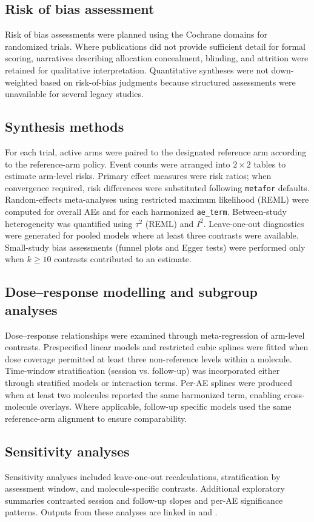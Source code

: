 \subsection{Risk of bias assessment}
Risk of bias assessments were planned using the Cochrane domains for randomized trials. Where publications did not provide sufficient detail for formal scoring, narratives describing allocation concealment, blinding, and attrition were retained for qualitative interpretation. Quantitative syntheses were not down-weighted based on risk-of-bias judgments because structured assessments were unavailable for several legacy studies.

\subsection{Synthesis methods}
For each trial, active arms were paired to the designated reference arm according to the reference-arm policy. Event counts were arranged into $2\times2$ tables to estimate arm-level risks. Primary effect measures were risk ratios; when convergence required, risk differences were substituted following \texttt{metafor} defaults. Random-effects meta-analyses using restricted maximum likelihood (REML) were computed for overall AEs and for each harmonized \texttt{ae\_term}. Between-study heterogeneity was quantified using $\tau^2$ (REML) and $I^2$. Leave-one-out diagnostics were generated for pooled models where at least three contrasts were available. Small-study bias assessments (funnel plots and Egger tests) were performed only when $k\geq10$ contrasts contributed to an estimate.

\subsection{Dose--response modelling and subgroup analyses}
Dose--response relationships were examined through meta-regression of arm-level contrasts. Prespecified linear models and restricted cubic splines were fitted when dose coverage permitted at least three non-reference levels within a molecule. Time-window stratification (session vs. follow-up) was incorporated either through stratified models or interaction terms. Per-AE splines were produced when at least two molecules reported the same harmonized term, enabling cross-molecule overlays. Where applicable, follow-up specific models used the same reference-arm alignment to ensure comparability.

\subsection{Sensitivity analyses}
Sensitivity analyses included leave-one-out recalculations, stratification by assessment window, and molecule-specific contrasts. Additional exploratory summaries contrasted session and follow-up slopes and per-AE significance patterns. Outputs from these analyses are linked in  and .

